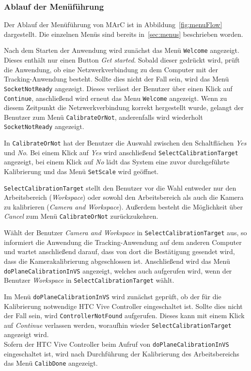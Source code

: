 \subsubsection{Ablauf der Menüführung}\label{sec:menuAblauf}
Der Ablauf der Menüführung von MArC ist in Abbildung~\ref{fig:menuFlow} dargestellt. Die einzelnen Menüs sind bereits in~\ref{sec:menus} beschrieben worden.

Nach dem Starten der Anwendung wird zunächst das Menü \texttt{Welcome} angezeigt. Dieses enthält nur einen Button \textit{Get started}. Sobald dieser gedrückt wird, prüft die Anwendung, ob eine Netzwerkverbindung zu dem Computer mit der Tracking-Anwendung besteht. Sollte dies nicht der Fall sein, wird das Menü \texttt{Socket\-Not\-Ready} angezeigt. Dieses verlässt der Benutzer über einen Klick auf \texttt{Continue}, anschließend wird erneut das Menu \texttt{Welcome} angezeigt. Wenn zu diesem Zeitpunkt die Netzwerkverbindung korrekt hergestellt wurde, gelangt der Benutzer zum Menü \texttt{Calibrate\-Or\-Not}, anderenfalls wird wiederholt \texttt{Socket\-Not\-Ready} angezeigt.

In \texttt{CalibrateOrNot} hat der Benutzer die Auswahl zwischen den Schaltflächen \textit{Yes} und \textit{No}. Bei einem Klick auf \textit{Yes} wird anschließend \texttt{Select\-Calibration\-Target} angezeigt, bei einem Klick auf \textit{No} lädt das System eine zuvor durchgeführte Kalibrierung und das Menü \texttt{Set\-Scale} wird geöffnet.

\texttt{Select\-Calibration\-Target} stellt den Benutzer vor die Wahl entweder nur den Arbeitsbereich (\textit{Work\-space}) oder sowohl den Arbeitsbereich als auch die Kamera zu kalibrieren (\textit{Camera and Workspace}). Außerdem besteht die Möglichkeit über \textit{Cancel} zum Menü \texttt{Calibrate\-Or\-Not} zurückzukehren.

Wählt der Benutzer \textit{Camera and Workspace} in \texttt{Select\-Calibration\-Target} aus, so informiert die Anwendung die Tracking-Anwendung auf dem anderen Computer und wartet anschließend darauf, dass von dort die Bestätigung gesendet wird, dass die Kamerakalibrierung abgeschlossen ist. Anschließend wird das Menü \texttt{doPlane\-Calibration\-InVS} angezeigt, welches auch aufgerufen wird, wenn der Benutzer \textit{Work\-space} in \texttt{Select\-Calibration\-Target} wählt.

Im Menü \texttt{doPlane\-Calibration\-InVS} wird zunächst geprüft, ob der für die Kalibrierung notwendige HTC Vive Controller eingeschaltet ist. Sollte dies nicht der Fall sein, wird \texttt{Controller\-Not\-Found} aufgerufen. Dieses kann mit einem Klick auf \textit{Continue} verlassen werden, woraufhin wieder \texttt{Select\-Calibration\-Target} angezeigt wird.\\
Sofern der HTC Vive Controller beim Aufruf von \texttt{doPlane\-Calibration\-InVS} eingeschaltet ist, wird nach Durchführung der Kalibrierung des Arbeitsbereichs das Menü \texttt{CalibDone} angezeigt.

